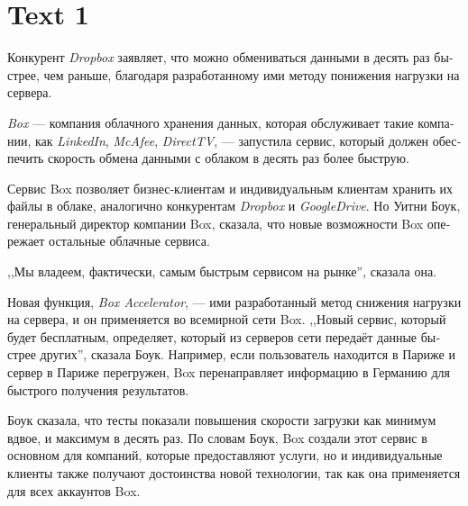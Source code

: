 \documentclass[a5paper,10pt,notitlepage,pdftex,headsepline]{scrartcl}
\begin{document}
\section{Text 1}
  \begin{otherlanguage}{russian}
    Конкурент \emph{Dropbox} заявляет, что можно обмениваться данными в десять раз
    быстрее, чем раньше, благодаря разработанному ими методу понижения
    нагрузки на сервера.

    \emph{Box} --- компания облачного хранения данных, которая обслуживает
    такие компании, как \emph{LinkedIn}, \emph{McAfee}, \emph{DirectTV}, ---
    запустила сервис, который должен обеспечить скорость обмена данными с
    облаком в десять раз более быструю.

    Сервис Box позволяет бизнес-клиентам и индивидуальным клиентам хранить их
    файлы в облаке, аналогично конкурентам \emph{Dropbox} и
    \emph{GoogleDrive}.
    Но Уитни Боук, генеральный директор компании Box, сказала, что новые
    возможности Box опережает остальные облачные сервиса.

    ,,Мы владеем, фактически, самым быстрым сервисом на рынке'', сказала она.

    Новая функция, \emph{Box Accelerator}, --- ими разработанный метод
    снижения нагрузки на сервера, и он применяется во всемирной сети Box.
    ,,Новый сервис, который будет бесплатным, определяет, который из серверов
    сети передаёт данные быстрее других'', сказала Боук.
    Например, если пользователь находится в Париже и сервер в Париже
    перегружен, Box перенаправляет информацию в Германию для быстрого
    получения результатов.

    Боук сказала, что тесты показали повышения скорости загрузки как минимум
    вдвое, и максимум в десять раз.
    По словам Боук, Box создали этот сервис в основном для компаний, которые
    предоставляют услуги, но и индивидуальные клиенты также получают
    достоинства новой технологии, так как она применяется для всех аккаунтов
    Box.
  \end{otherlanguage}
\end{document}
